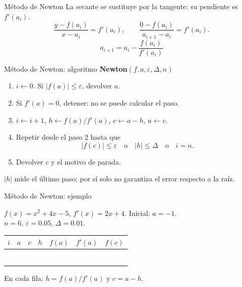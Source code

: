 \documentclass[main.tex]{subfiles}
\begin{document}
\graphicspath{{imagenes/tema8/}{../imagenes/tema8/}}

\begin{frame}[t]{Método de Newton}
La secante se sustituye por la tangente: su pendiente es $f'(a_i)$.
\[\frac{y-f(a_i)}{x-a_i}=f'(a_i),\qquad
\frac{0-f(a_i)}{a_{i+1}-a_i}=f'(a_i).\]
\[\boxed{a_{i+1}=a_i-\frac{f(a_i)}{f'(a_i)}}\]
\end{frame}
\begin{frame}[t]{Método de Newton: algoritmo}
\small
\textbf{Newton}$(f,a,\varepsilon,\Delta,n)$
\begin{enumerate}
\item $i\gets0$. Si $|f(a)|\le\varepsilon$, devolver $a$.
\item Si $f'(a)=0$, detener: no se puede calcular el paso.
\item $i\gets i+1$, $h\gets f(a)/f'(a)$, $c\gets a-h$, $a\gets c$.
\item Repetir desde el paso 2 hasta que
\[|f(c)|\le\varepsilon\quad\text{o}\quad |h|\le\Delta\quad\text{o}\quad i=n.\]
\item Devolver $c$ y el motivo de parada.
\end{enumerate}
\medskip $|h|$ mide el último paso; por sí solo no garantiza el error respecto a la raíz.
\end{frame}
\begin{frame}[t]{Método de Newton: ejemplo}
\begin{minipage}[t][17mm]{\textwidth}\small
$f(x)=x^2+4x-5$, $f'(x)=2x+4$. Inicial: $a=-1$.\\
$n=6$, $\varepsilon=0.05$, $\Delta=0.01$.
\end{minipage}\begingroup\scriptsize\setlength{\tabcolsep}{2pt}
\begin{center}\begin{tabular}{|C{.04\textwidth}|*{6}{C{.135\textwidth}|}}\hline
$i$&$a$&$c$&$h$&$f(a)$&$f'(a)$&$f(c)$\\\hline
\rule{0pt}{5mm}&&&&&&\\\hline
\rule{0pt}{5mm}&&&&&&\\\hline
\rule{0pt}{5mm}&&&&&&\\\hline
\rule{0pt}{5mm}&&&&&&\\\hline
\rule{0pt}{5mm}&&&&&&\\\hline
\rule{0pt}{5mm}&&&&&&\\\hline
\end{tabular}\end{center}\endgroup\small En cada fila: $h=f(a)/f\prime(a)$ y $c=a-h$.
\end{frame}
\end{document}
